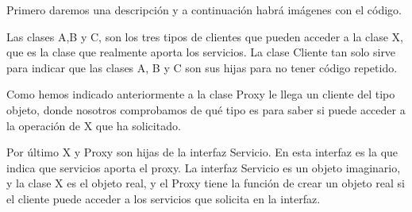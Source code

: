 \documentclass[11pt,a4paper]{article}
\begin{document}
Primero daremos una descripción y a continuación habrá imágenes con el código.

	Las clases A,B y C, son los tres tipos de clientes que pueden acceder a la clase X, que es la clase que realmente aporta los servicios. La clase Cliente tan solo sirve para indicar que las clases A, B y C son sus hijas para no tener código repetido.

	Como hemos indicado anteriormente a la clase Proxy le llega un cliente del tipo objeto, donde nosotros comprobamos de qué tipo es para saber si puede acceder a la operación de X que ha solicitado.
	
	Por último X y Proxy son hijas de la interfaz Servicio. En esta interfaz es la que indica que servicios aporta el proxy. La interfaz Servicio es un objeto imaginario, y la clase X es el objeto real, y el Proxy tiene la función de crear un objeto real si el cliente puede acceder a los servicios que solicita en la interfaz.

\begin{figure}[H]
\end{figure}

\begin{figure}[H]
\end{figure}
\end{document}

